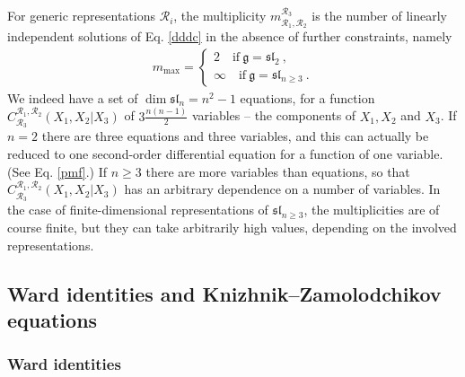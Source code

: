 \documentclass[12pt, a4paper, notitlepage, twoside]{report}
\numberwithin{equation}{section}
\theoremstyle{break}
\begin{document}
For generic representations $\mathcal{R}_i$, the multiplicity $m_{\mathcal{R}_1,\mathcal{R}_2}^{\mathcal{R}_3}$ is the number of linearly independent solutions of Eq. \eqref{dddc} in the absence of further constraints, namely
\begin{align}
 m_{\mathrm{max}} = \left\{\begin{array}{l}  2 \quad \text{if}\ \mathfrak{g}=\mathfrak{sl}_2\ , \\ \infty \quad \text{if}\ \mathfrak{g}=\mathfrak{sl}_{n\geq 3}\ . \end{array}\right. 
\end{align}
We indeed have a set of $\dim \mathfrak{sl}_n=n^2-1$ equations, for a function $C^{\mathcal{R}_1,\mathcal{R}_2}_{\mathcal{R}_3}(X_1,X_2|X_3)$ of $3\frac{n(n-1)}{2}$ variables -- the components of $X_1,X_2$ and $X_3$.
If $n=2$ there are three equations and three variables, and this can actually be reduced to one second-order differential equation for a function of one variable. (See Eq. \eqref{pmf}.)
If $n\geq 3$ there are more variables than equations, so that $C^{\mathcal{R}_1,\mathcal{R}_2}_{\mathcal{R}_3}(X_1,X_2|X_3)$ has an arbitrary dependence on a number of variables.
In the case of finite-dimensional representations of $\mathfrak{sl}_{n\geq 3}$, the multiplicities are of course finite, but they can take arbitrarily high values, depending on the involved representations.

\subsection{Ward identities and Knizhnik--Zamolodchikov equations \label{secwikz}}

\subsubsection{Ward identities}
\end{document}
